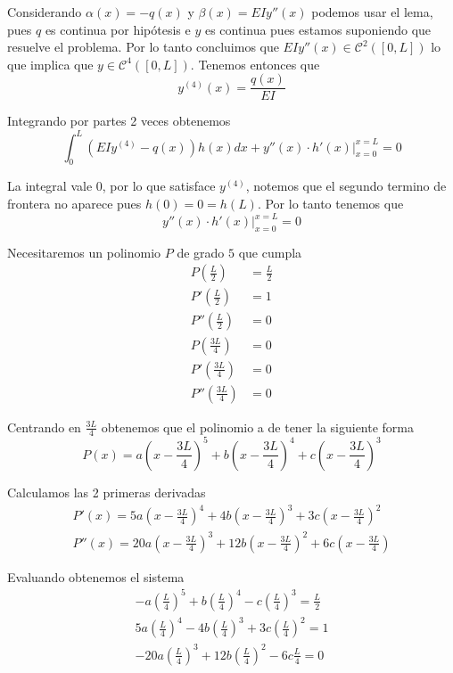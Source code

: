 \documentclass[a4paper,oneside,10.5pt]{USMArt}
\begin{document}
\begin{sol}
  Considerando $\alpha(x) = -q(x)$ y $\beta(x) = EIy''(x)$ podemos usar el lema,
  pues $q$ es continua por hipótesis e $y$ es continua pues estamos suponiendo que resuelve el problema. Por lo tanto
  concluimos que $EIy''(x) \in \mathcal{C}^{2}([0, L])$ lo que implica que $y \in \mathcal{C}^{4}([0, L])$. Tenemos
  entonces que
  \begin{equation*}
    y^{(4)}(x) = \frac{q(x)}{EI}
  \end{equation*}

  Integrando por partes 2 veces obtenemos
  \begin{equation*}
    \int_{0}^{L} (EIy^{(4)} - q(x))h(x) dx + y''(x) \cdot h'(x)|_{x = 0}^{x = L} = 0
  \end{equation*}

  La integral vale $0$, por lo que satisface $y^{(4)}$, notemos que el segundo termino
  de frontera no aparece pues $h(0) = 0 = h(L)$. Por lo tanto tenemos que
  \begin{equation*}
    y''(x) \cdot h'(x)|_{x = 0}^{x = L} = 0
  \end{equation*}

  Necesitaremos un polinomio $P$ de grado $5$ que cumpla
  \begin{align*}
    P(\frac{L}{2}) &= \frac{L}{2}\\
    P'(\frac{L}{2}) &= 1\\
    P''(\frac{L}{2}) &= 0\\
    P(\frac{3L}{4}) &= 0\\
    P'(\frac{3L}{4}) &= 0\\
    P''(\frac{3L}{4}) &= 0
  \end{align*}

  Centrando en $\frac{3L}{4}$ obtenemos que el polinomio a de tener la siguiente forma
  \begin{equation*}
    P(x) = a(x - \frac{3L}{4})^{5} + b(x - \frac{3L}{4})^{4} + c(x - \frac{3L}{4})^{3}
  \end{equation*}

  Calculamos las 2 primeras derivadas
  \begin{gather*}
    P'(x) = 5a(x - \frac{3L}{4})^{4} + 4b(x - \frac{3L}{4})^{3} + 3c(x - \frac{3L}{4})^{2}\\
    P''(x) = 20a(x - \frac{3L}{4})^{3} + 12b(x - \frac{3L}{4})^{2} + 6c(x - \frac{3L}{4})
  \end{gather*}

  Evaluando obtenemos el sistema
  \begin{gather*}
    -a(\frac{L}{4})^{5} + b (\frac{L}{4})^{4} - c(\frac{L}{4})^{3} = \frac{L}{2}\\
    5a (\frac{L}{4})^{4} - 4b (\frac{L}{4})^{3} + 3c (\frac{L}{4})^{2} = 1\\
    -20a (\frac{L}{4})^{3} + 12b (\frac{L}{4})^{2} - 6c \frac{L}{4} = 0
  \end{gather*}


\end{sol}
\end{document}
